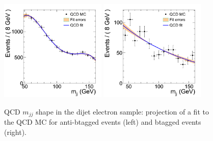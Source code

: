 \begin{figure}
\begin{center}
\includegraphics[width=0.45\textwidth]{figs/wpj/Dibosonlnujj_QCD_electron_2jets.png}
\includegraphics[width=0.45\textwidth]{figs/wpj/DibosonBtaglnujj_QCD_electron_2jets.png}
\end{center}
\caption{QCD $m_{jj}$ shape in the dijet electron sample: projection of a fit to the QCD MC for anti-btagged events (left) and btagged events (right).}
\label{fig:QCDFit_Dijet}
\end{figure}
